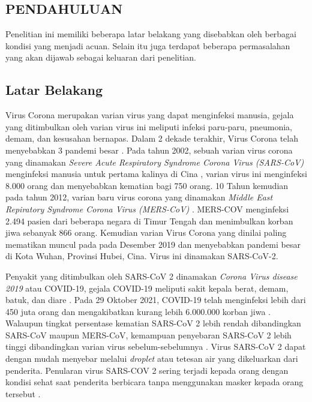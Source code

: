 
\begin{spacing}{1.2}
  \chapter{PENDAHULUAN}
\end{spacing}

\vspace{4ex}

Penelitian ini memiliki beberapa latar belakang yang disebabkan oleh berbagai kondisi yang menjadi 
acuan. Selain itu juga terdapat beberapa permasalahan yang akan dijawab sebagai keluaran dari 
penelitian.

\section{Latar Belakang}
Virus Corona merupakan varian virus yang dapat menginfeksi manusia, gejala yang ditimbulkan oleh varian
virus ini meliputi infeksi paru-paru, pneumonia, demam, dan kesusahan bernapas. Dalam 2 dekade terakhir,
Virus Corona telah menyebabkan 3 pandemi besar \cite{10.1093/ajcp/aqaa029}.
Pada tahun 2002, sebuah varian virus corona yang dinamakan \textit{Severe Acute Respiratory Syndrome Corona Virus
(SARS-CoV)} menginfeksi manusia untuk pertama kalinya di Cina \cite{pmid12690091,pmid12690092},
varian virus ini menginfeksi 8.000 orang dan menyebabkan kematian bagi 750 orang. 10 Tahun kemudian pada tahun 2012,
varian baru virus corona yang dinamakan \textit{Middle East Repiratory Syndrome Corona Virus (MERS-CoV)} \cite{pmid23075143}.
MERS-COV menginfeksi 2.494 pasien dari beberapa negara di Timur Tengah dan menimbulkan korban jiwa sebanyak 866 orang. Kemudian varian Virus Corona
yang dinilai paling mematikan muncul pada pada Desember 2019 dan menyebabkan pandemi besar di Kota Wuhan, Provinsi Hubei,
Cina. Virus ini dinamakan SARS-CoV-2.

Penyakit yang ditimbulkan oleh SARS-CoV 2 dinamakan \textit{Corona Virus disease 2019} atau COVID-19,
gejala COVID-19 meliputi sakit kepala berat, demam, batuk, dan diare \cite{pmid32835023}.
Pada 29 Oktober 2021, COVID-19 telah menginfeksi lebih dari 450 juta orang dan mengakibatkan kurang lebih 6.000.000 korban jiwa
\cite{WHO}. Walaupun tingkat persentase kematian SARS-CoV 2 lebih rendah dibandingkan SARS-CoV maupun MERS-CoV,
kemampuan penyebaran SARS-CoV 2 lebih tinggi dibandingkan varian virus sebelum-sebelumnya \cite{pmid32226295}.
Virus SARS-CoV 2 dapat dengan mudah menyebar melalui \textit{droplet} atau tetesan air yang dikeluarkan dari
penderita. Penularan virus SARS-COV 2 sering terjadi kepada orang dengan kondisi sehat
saat penderita berbicara tanpa menggunakan masker kepada orang tersebut \cite{pmid32355904}.

